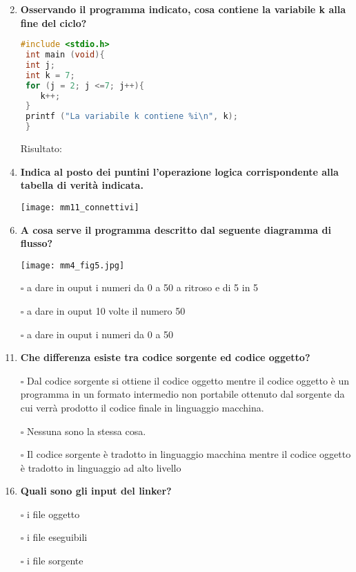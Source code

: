 \documentclass[9pt]{article}
\begin{document}
\begin{enumerate}
 \begin{lstlisting}[language=c]
#include <stdio.h>
int main (void){
 int j = 7;
 int k = 7; 
 while (j > 2){
  	j--;
   	k++;
  }
  printf ("La variabile k contiene %i\n", k);
 }
\end{lstlisting}   

Risultato: 
\item [\nonumber]
\item {\bf Osservando il programma indicato, cosa contiene la variabile k alla fine del ciclo?}
\begin{lstlisting}[language=c]
#include <stdio.h>
 int main (void){
 int j;
 int k = 7;
 for (j = 2; j <=7; j++){
 	k++;
 }
 printf ("La variabile k contiene %i\n", k);
 }
\end{lstlisting} 

Risultato: 
\item [\nonumber]
\item{\bf Indica al posto dei puntini l'operazione logica corrispondente alla tabella di verit\`{a} indicata.}
\begin{center}
\texttt{[image: mm11\_connettivi]}
\end{center}


\item [\nonumber]
\item {\bf A cosa serve il programma descritto dal seguente diagramma di flusso?}
\begin{center}
\texttt{[image: mm4\_fig5.jpg]}
\end{center}

\item[$\square$]a dare in ouput i numeri da 0 a 50 a ritroso e di 5 in 5
\item[$\square$]a dare in ouput 10 volte il numero 50
\item[$\square$]a dare in ouput i numeri da 0 a 50

\item [\nonumber]
\item {\bf Che differenza esiste tra codice sorgente ed codice oggetto?}

\item[$\square$]Dal codice sorgente si ottiene il codice oggetto mentre il codice oggetto \`{e} un programma in un formato intermedio non portabile ottenuto dal sorgente da cui verrà prodotto il codice finale in linguaggio macchina. 
\item[$\square$]Nessuna sono la stessa cosa.
\item[$\square$]Il codice sorgente \`{e} tradotto in linguaggio macchina mentre il codice oggetto \`{e} tradotto in linguaggio ad alto livello

\item [\nonumber]
\item {\bf Quali sono gli input del linker?}
\item[$\square$] i file oggetto
\item[$\square$] i file eseguibili
\item[$\square$] i file sorgente

\end{enumerate}



 
\end{document}
